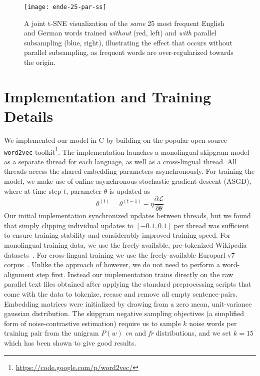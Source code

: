 \documentclass[10pt]{article}
\newcommand\loss{\mathcal{L}}
\begin{document}
\begin{figure}
  \centering
\texttt{[image: ende-25-par-ss]} 
    \caption{A joint t-SNE visualization of the \emph{same} 25 most frequent English and German
  words trained \emph{without} (red, left) and \emph{with} parallel subsampling (blue, right),
  illustrating the effect that occurs without parallel subsampling,
  as frequent words are over-regularized towards the origin.}
   \label{fig:subsample}
\end{figure}

\section{Implementation and Training Details}
We implemented our model in C by building on the popular open-source
\texttt{word2vec} toolkit\footnote{\url{https://code.google.com/p/word2vec/}}.
The implementation launches a monolingual skipgram model as a separate thread
for each language, as well as a cross-lingual thread. All threads access
the shared embedding parameters asynchronously. For training the model, we make
use of online asynchronous stochastic gradient descent (ASGD), where
at time step $t$, parameter $\theta$ is updated as 
\begin{equation}
    \label{eqn:bilbowa-sgd}
    \theta^{(t)} = \theta^{(t-1)} - \eta \frac{\partial \loss}{\partial \theta}
\end{equation}
Our initial implementation synchronized updates between threads, but we found
that simply clipping individual updates to $[-0.1,0.1]$ per thread was sufficient to
ensure training stability and considerably improved training speed.  For
monolingual training data, we use the freely available, pre-tokenized
Wikipedia datasets~\cite{polyglot2013}. For cross-lingual training we use the
freely-available Europarl v7 corpus~\cite{koehn2005europarl}. Unlike
the approach of \cite{klementiev2012} however, we do not need to perform a word-alignment step
first. Instead our implementation trains directly on the raw parallel text
files obtained after applying the standard preprocessing scripts that come with
the data to tokenize, recase and remove all empty sentence-pairs. Embedding
matrices were initialized by drawing from a zero mean, unit-variance gaussian
distribution. The skipgram negative sampling objectives (a simplified form
of noise-contrastive estimation) require us to sample $k$ noise words per training 
pair from the unigram $P(w)$ \emph{en} and \emph{fr}  distributions, and we 
set $k=15$ which has been shown to give good results.
\end{document}
